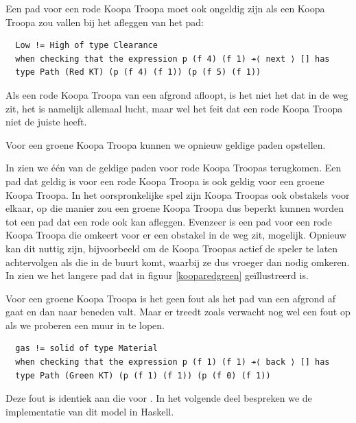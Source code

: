 Een pad voor een rode Koopa Troopa moet ook ongeldig zijn als een Koopa Troopa
zou vallen bij het afleggen van het pad:

\begin{verbatim}
  Low != High of type Clearance
  when checking that the expression p (f 4) (f 1) ↠⟨ next ⟩ [] has
  type Path (Red KT) (p (f 4) (f 1)) (p (f 5) (f 1))
\end{verbatim}

Als een rode Koopa Troopa van een afgrond afloopt, is het niet het
 dat in de weg zit, het is namelijk allemaal lucht, maar wel
het feit dat een rode Koopa Troopa niet de juiste  heeft.

Voor een groene Koopa Troopa kunnen we opnieuw geldige paden opstellen.


In  zien we één van de geldige paden voor rode Koopa
Troopas terugkomen. Een pad dat geldig is voor een rode Koopa Troopa is ook
geldig voor een groene Koopa Troopa. In het oorspronkelijke spel zijn Koopa
Troopas ook obstakels voor elkaar, op die manier zou een groene Koopa Troopa
dus beperkt kunnen worden tot een pad dat een rode ook kan afleggen. Evenzeer
is een pad voor een rode Koopa Troopa die omkeert voor er een obstakel in de
weg zit, mogelijk. Opnieuw kan dit nuttig zijn, bijvoorbeeld om de Koopa
Troopas actief de speler te laten achtervolgen als die in de buurt komt,
waarbij ze dus vroeger dan nodig omkeren. In  zien we het
langere pad dat in figuur \ref{kooparedgreen} geïllustreerd is.

Voor een groene Koopa Troopa is het geen fout als het pad van een afgrond af
gaat en dan naar beneden valt. Maar er treedt zoals verwacht nog wel een fout
op als we proberen een muur in te lopen.


\begin{verbatim}
  gas != solid of type Material
  when checking that the expression p (f 1) (f 1) ↠⟨ back ⟩ [] has
  type Path (Green KT) (p (f 1) (f 1)) (p (f 0) (f 1))
\end{verbatim}

Deze fout is identiek aan die voor . In het volgende deel
bespreken we de implementatie van dit model in Haskell.


